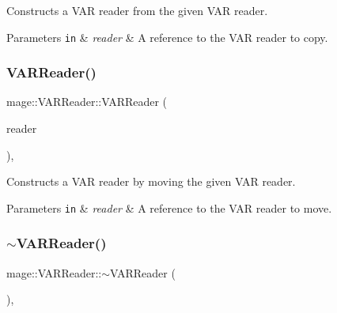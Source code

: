 Constructs a V\+AR reader from the given V\+AR reader.


\begin{DoxyParams}[1]{Parameters}
\mbox{\tt in}  & {\em reader} & A reference to the V\+AR reader to copy. \\
\hline
\end{DoxyParams}
\hypertarget{classmage_1_1_v_a_r_reader_a992526da4076d5ef0b33400a4ff26cfa}{}\label{classmage_1_1_v_a_r_reader_a992526da4076d5ef0b33400a4ff26cfa} 
\subsubsection{\texorpdfstring{V\+A\+R\+Reader()}{VARReader()}\hspace{0.1cm}{\footnotesize\ttfamily [3/3]}}
{\footnotesize\ttfamily mage\+::\+V\+A\+R\+Reader\+::\+V\+A\+R\+Reader (\begin{DoxyParamCaption}\item[{\hyperlink{classmage_1_1_v_a_r_reader}{V\+A\+R\+Reader} \&\&}]{reader }\end{DoxyParamCaption})\hspace{0.3cm}{\ttfamily [default]}, {\ttfamily [noexcept]}}

Constructs a V\+AR reader by moving the given V\+AR reader.


\begin{DoxyParams}[1]{Parameters}
\mbox{\tt in}  & {\em reader} & A reference to the V\+AR reader to move. \\
\hline
\end{DoxyParams}
\hypertarget{classmage_1_1_v_a_r_reader_ad6d33cedc71285380eeda74e45e4a1d2}{}\label{classmage_1_1_v_a_r_reader_ad6d33cedc71285380eeda74e45e4a1d2} 
\subsubsection{\texorpdfstring{$\sim$\+V\+A\+R\+Reader()}{~VARReader()}}
{\footnotesize\ttfamily mage\+::\+V\+A\+R\+Reader\+::$\sim$\+V\+A\+R\+Reader (\begin{DoxyParamCaption}{ }\end{DoxyParamCaption})\hspace{0.3cm}{\ttfamily [virtual]}, {\ttfamily [default]}}


